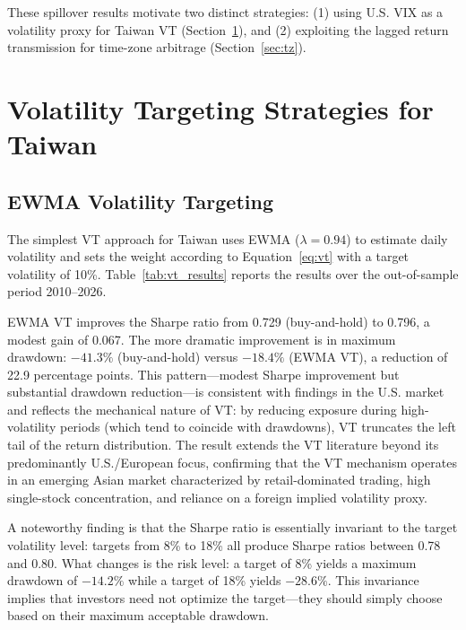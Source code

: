 These spillover results motivate two distinct strategies: (1) using U.S. VIX as a volatility proxy for Taiwan VT (Section~\ref{sec:vt}), and (2) exploiting the lagged return transmission for time-zone arbitrage (Section~\ref{sec:tz}).



\section{Volatility Targeting Strategies for Taiwan}
\label{sec:vt}

\subsection{EWMA Volatility Targeting}

The simplest VT approach for Taiwan uses EWMA ($\lambda = 0.94$) to estimate daily volatility and sets the weight according to Equation~\eqref{eq:vt} with a target volatility of 10\%. Table~\ref{tab:vt_results} reports the results over the out-of-sample period 2010--2026.

EWMA VT improves the Sharpe ratio from 0.729 (buy-and-hold) to 0.796, a modest gain of 0.067. The more dramatic improvement is in maximum drawdown: $-41.3\%$ (buy-and-hold) versus $-18.4\%$ (EWMA VT), a reduction of 22.9 percentage points. This pattern---modest Sharpe improvement but substantial drawdown reduction---is consistent with findings in the U.S. market \citep{moreira2017,harvey2018} and reflects the mechanical nature of VT: by reducing exposure during high-volatility periods (which tend to coincide with drawdowns), VT truncates the left tail of the return distribution. The result extends the VT literature beyond its predominantly U.S./European focus, confirming that the VT mechanism operates in an emerging Asian market characterized by retail-dominated trading, high single-stock concentration, and reliance on a foreign implied volatility proxy.

A noteworthy finding is that the Sharpe ratio is essentially invariant to the target volatility level: targets from 8\% to 18\% all produce Sharpe ratios between 0.78 and 0.80. What changes is the risk level: a target of 8\% yields a maximum drawdown of $-14.2\%$ while a target of 18\% yields $-28.6\%$. This invariance implies that investors need not optimize the target---they should simply choose based on their maximum acceptable drawdown.

